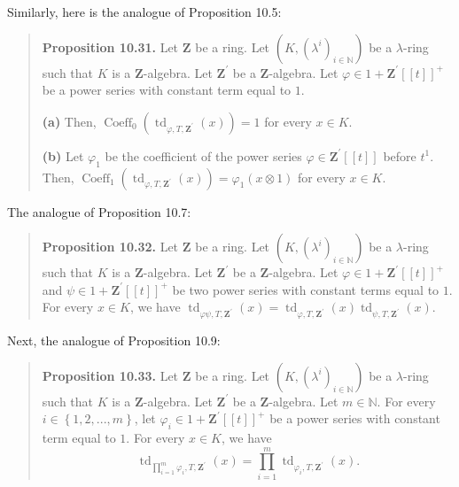 \documentclass[numbers=enddot,12pt,final,onecolumn,notitlepage]{scrartcl}%
\begin{document}
Similarly, here is the analogue of Proposition 10.5:

\begin{quote}
\textbf{Proposition 10.31.} Let $\mathbf{Z}$ be a ring. Let $\left(  K,\left(
\lambda^{i}\right)  _{i\in\mathbb{N}}\right)  $ be a $\lambda$-ring such that
$K$ is a $\mathbf{Z}$-algebra. Let $\mathbf{Z}^{\prime}$ be a $\mathbf{Z}%
$-algebra. Let $\varphi\in1+\mathbf{Z}^{\prime}\left[  \left[  t\right]
\right]  ^{+}$ be a power series with constant term equal to $1$.

\textbf{(a)} Then, $\operatorname*{Coeff}\nolimits_{0}\left(
\operatorname*{td}\nolimits_{\varphi,T,\mathbf{Z}^{\prime}}\left(  x\right)
\right)  =1$ for every $x\in K$.

\textbf{(b)} Let $\varphi_{1}$ be the coefficient of the power series
$\varphi\in\mathbf{Z}^{\prime}\left[  \left[  t\right]  \right]  $ before
$t^{1}$. Then, $\operatorname*{Coeff}\nolimits_{1}\left(  \operatorname*{td}%
\nolimits_{\varphi,T,\mathbf{Z}^{\prime}}\left(  x\right)  \right)
=\varphi_{1}\left(  x\otimes1\right)  $ for every $x\in K$.
\end{quote}

The analogue of Proposition 10.7:

\begin{quote}
\textbf{Proposition 10.32.} Let $\mathbf{Z}$ be a ring. Let $\left(  K,\left(
\lambda^{i}\right)  _{i\in\mathbb{N}}\right)  $ be a $\lambda$-ring such that
$K$ is a $\mathbf{Z}$-algebra. Let $\mathbf{Z}^{\prime}$ be a $\mathbf{Z}%
$-algebra. Let $\varphi\in1+\mathbf{Z}^{\prime}\left[  \left[  t\right]
\right]  ^{+}$ and $\psi\in1+\mathbf{Z}^{\prime}\left[  \left[  t\right]
\right]  ^{+}$ be two power series with constant terms equal to $1$. For every
$x\in K$, we have $\operatorname*{td}\nolimits_{\varphi\psi,T,\mathbf{Z}%
^{\prime}}\left(  x\right)  =\operatorname*{td}\nolimits_{\varphi
,T,\mathbf{Z}^{\prime}}\left(  x\right)  \operatorname*{td}\nolimits_{\psi
,T,\mathbf{Z}^{\prime}}\left(  x\right)  $.
\end{quote}

Next, the analogue of Proposition 10.9:

\begin{quote}
\textbf{Proposition 10.33.} Let $\mathbf{Z}$ be a ring. Let $\left(  K,\left(
\lambda^{i}\right)  _{i\in\mathbb{N}}\right)  $ be a $\lambda$-ring such that
$K$ is a $\mathbf{Z}$-algebra. Let $\mathbf{Z}^{\prime}$ be a $\mathbf{Z}%
$-algebra. Let $m\in\mathbb{N}$. For every $i\in\left\{  1,2,...,m\right\}  $,
let $\varphi_{i}\in1+\mathbf{Z}^{\prime}\left[  \left[  t\right]  \right]
^{+}$ be a power series with constant term equal to $1$. For every $x\in K$,
we have%
\[
\operatorname*{td}\nolimits_{\prod\limits_{i=1}^{m}\varphi_{i},T,\mathbf{Z}%
^{\prime}}\left(  x\right)  =\prod\limits_{i=1}^{m}\operatorname*{td}%
\nolimits_{\varphi_{i},T,\mathbf{Z}^{\prime}}\left(  x\right)  .
\]



\end{quote}
\end{document}
